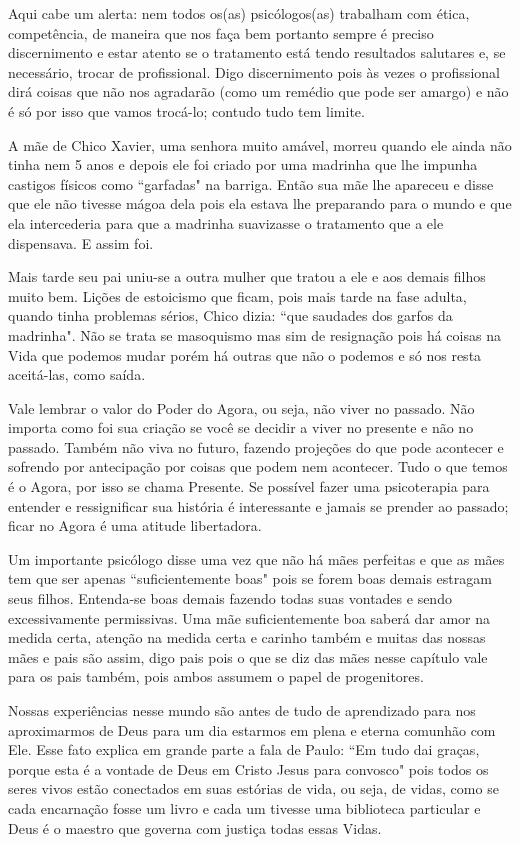 \emdash{}Aqui cabe um alerta: nem todos os(as) psicólogos(as) trabalham com ética, competência, de maneira que nos faça bem portanto sempre é preciso discernimento e estar atento se o tratamento está tendo resultados salutares e, se necessário, trocar de profissional. Digo discernimento pois às vezes o profissional dirá coisas que não nos agradarão (como um remédio que pode ser amargo) e não é só por isso que vamos trocá-lo; contudo tudo tem limite.

\emdash{}A mãe de Chico Xavier, uma senhora muito amável, morreu quando ele ainda não tinha nem 5 anos e depois ele foi criado por uma madrinha que lhe impunha castigos físicos como ``garfadas" na barriga. Então sua mãe lhe apareceu e disse que ele não tivesse mágoa dela pois ela estava lhe preparando para o mundo e que ela intercederia para que a madrinha suavizasse o tratamento que a ele dispensava. E assim foi.

\emdash{}Mais tarde seu pai uniu-se a outra mulher que tratou a ele e aos demais filhos muito bem. Lições de estoicismo que ficam, pois mais tarde na fase adulta, quando tinha problemas sérios, Chico dizia: ``que saudades dos garfos da madrinha". Não se trata se masoquismo mas sim de resignação pois há coisas na Vida que podemos mudar porém há outras que não o podemos e só nos resta aceitá-las, como saída.

\emdash{}Vale lembrar o valor do Poder do Agora, ou seja, não viver no passado. Não importa como foi sua criação se você se decidir a viver no presente e não no passado. Também não viva no futuro, fazendo projeções do que pode acontecer e sofrendo por antecipação por coisas que podem nem acontecer. Tudo o que temos é o Agora, por isso se chama Presente. Se possível fazer uma psicoterapia para entender e ressignificar sua história é interessante e jamais se prender ao passado; ficar no Agora é uma atitude libertadora.

\emdash{}Um importante psicólogo disse uma vez que não há mães perfeitas e que as mães tem que ser apenas ``suficientemente boas" pois se forem boas demais estragam seus filhos. Entenda-se boas demais fazendo todas suas vontades e sendo excessivamente permissivas. Uma mãe suficientemente boa saberá dar amor na medida certa, atenção na medida certa e carinho também e muitas das nossas mães e pais são assim, digo pais pois o que se diz das mães nesse capítulo vale para os pais também, pois ambos assumem o papel de progenitores.

\emdash{}Nossas experiências nesse mundo são antes de tudo de aprendizado para nos aproximarmos de Deus para um dia estarmos em plena e eterna comunhão com Ele. Esse fato explica em grande parte a fala de Paulo: ``Em tudo dai graças, porque esta é a vontade de Deus em Cristo Jesus para convosco" pois todos os seres vivos estão conectados em suas estórias de vida, ou seja, de vidas, como se cada encarnação fosse um livro e cada um tivesse uma biblioteca particular e Deus é o maestro que governa com justiça todas essas Vidas.


